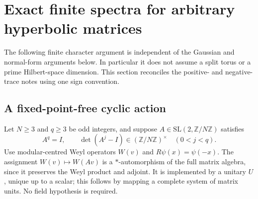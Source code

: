 \section{Exact finite spectra for arbitrary hyperbolic matrices}
\label{sec:general-spectra}
The following finite character argument is independent of the Gaussian and
normal-form arguments below. In particular it does not assume a split torus
or a prime Hilbert-space dimension. This section reconciles the positive- and
negative-trace notes using one sign convention.

\subsection{A fixed-point-free cyclic action}
Let $N\geq3$ and $q\geq3$ be odd integers, and suppose
$A\in\mathrm{SL}(2,\mathbb Z/N\mathbb Z)$ satisfies
\begin{equation}\label{eq:general-free}
 A^q=I,\qquad \det(A^j-I)\in(\mathbb Z/N\mathbb Z)^\times
                      \quad(0<j<q).
\end{equation}
Use modular-centred Weyl operators $W(v)$ and $R\psi(x)=\psi(-x)$.
The assignment $W(v)\mapsto W(Av)$ is a $*$-automorphism of the full matrix
algebra, since it preserves the Weyl product and adjoint. It is implemented
by a unitary $U$, unique up to a scalar; this follows by mapping a complete
system of matrix units. No field hypothesis is required.

